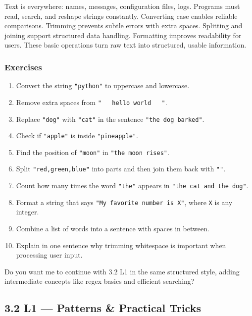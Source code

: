 \documentclass[
  letterpaper,
  DIV=11,
  numbers=noendperiod]{scrreprt}
\providecommand{\tightlist}{%
  \setlength{\itemsep}{0pt}\setlength{\parskip}{0pt}}
\begin{document}
Text is everywhere: names, messages, configuration files, logs. Programs
must read, search, and reshape strings constantly. Converting case
enables reliable comparisons. Trimming prevents subtle errors with extra
spaces. Splitting and joining support structured data handling.
Formatting improves readability for users. These basic operations turn
raw text into structured, usable information.

\subsubsection{Exercises}\label{exercises-33}

\begin{enumerate}
\def\labelenumi{\arabic{enumi}.}
\tightlist
\item
  Convert the string \texttt{"python"} to uppercase and lowercase.
\item
  Remove extra spaces from \texttt{"\ \ \ hello\ world\ \ \ "}.
\item
  Replace \texttt{"dog"} with \texttt{"cat"} in the sentence
  \texttt{"the\ dog\ barked"}.
\item
  Check if \texttt{"apple"} is inside \texttt{"pineapple"}.
\item
  Find the position of \texttt{"moon"} in \texttt{"the\ moon\ rises"}.
\item
  Split \texttt{"red,green,blue"} into parts and then join them back
  with \texttt{"\textbar{}"}.
\item
  Count how many times the word \texttt{"the"} appears in
  \texttt{"the\ cat\ and\ the\ dog"}.
\item
  Format a string that says \texttt{"My\ favorite\ number\ is\ X"},
  where \texttt{X} is any integer.
\item
  Combine a list of words into a sentence with spaces in between.
\item
  Explain in one sentence why trimming whitespace is important when
  processing user input.
\end{enumerate}

Do you want me to continue with 3.2 L1 in the same structured style,
adding intermediate concepts like regex basics and efficient searching?

\subsection{3.2 L1 --- Patterns \& Practical
Tricks}\label{l1-patterns-practical-tricks}
\end{document}
